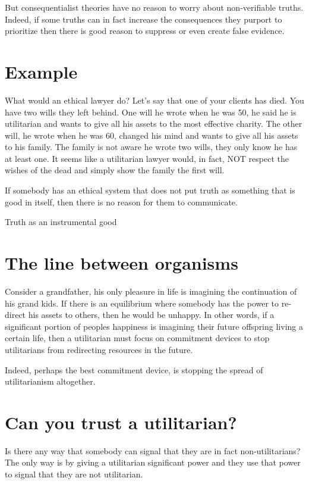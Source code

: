 \documentclass[11pt]{article}
\numberwithin{equation}{section}
\begin{document}
But consequentialist theories have no reason to worry about non-verifiable truths. Indeed, if some truths can in fact increase the consequences they purport to prioritize then there is good reason to suppress or even create false evidence.  

\section{Example}

What would an ethical lawyer do? Let’s say that one of your clients has died. You have two wills they left behind. One will he wrote when he was 50, he said he is utilitarian and wants to give all his assets to the most effective charity. The other will, he wrote when he was 60, changed his mind and wants to give all his assets to his family. The family is not aware he wrote two wills, they only know he has at least one.
It seems like a utilitarian lawyer would, in fact, NOT respect the wishes of the dead and simply show the family the first will.

If somebody has an ethical system that does not put truth as something that is good in itself, then there is no reason for them to communicate. 

Truth as an instrumental good

\section{The line between organisms}

Consider a grandfather, his only pleasure in life is imagining the continuation of his grand kids. If there is an equilibrium where somebody has the power to re-direct his assets to others, then he would be unhappy. In other words, if a significant portion of peoples happiness is imagining their future offspring living a certain life, then a utilitarian must focus on commitment devices to stop utilitarians from redirecting resources in the future. 

Indeed, perhaps the best commitment device, is stopping the spread of utilitarianism altogether. 

\section{Can you trust a utilitarian?}

Is there any way that somebody can signal that they are in fact non-utilitarians? The only way is by giving a utilitarian significant power and they use that power to signal that they are not utilitarian.
\end{document}
